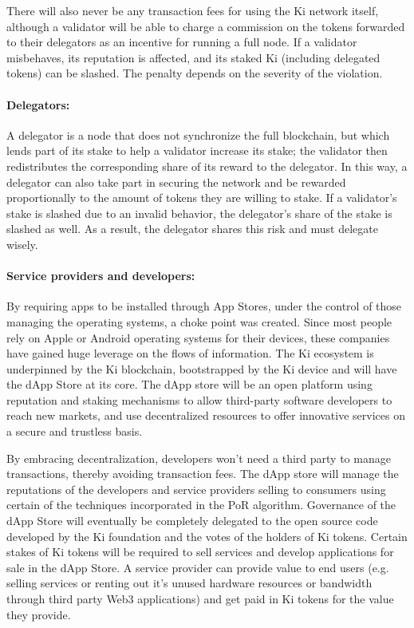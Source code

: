 There will also never be any transaction fees for using the Ki network itself, although a validator will be able to charge a commission on the tokens forwarded to their delegators as an incentive for running a full node. If a validator misbehaves, its reputation is affected, and its staked Ki (including delegated tokens) can be slashed. The penalty depends on the severity of the violation.

\paragraph{Delegators:} A delegator is a node that does not synchronize the full blockchain, but which lends part of its stake to help a validator increase its stake; the validator then redistributes the corresponding share of its reward to the delegator. In this way, a delegator can also take part in securing the network and be rewarded proportionally to the amount of tokens they are willing to stake. If a validator's stake is slashed due to an invalid behavior, the delegator's share of the stake is slashed as well. As a result, the delegator shares this risk and must delegate wisely.

\paragraph{Service providers and developers:} By requiring apps to be installed through App Stores, under the control of those managing the operating systems, a choke point was created. Since most people rely on Apple or Android operating systems for their devices, these companies have gained huge leverage on the flows of information. The Ki ecosystem is underpinned by the Ki blockchain, bootstrapped by the Ki device and will have the dApp Store at its core. The dApp store will be an open platform using reputation and staking mechanisms to allow third-party software developers to reach new markets, and use decentralized resources to offer innovative services on a secure and trustless basis.


By embracing decentralization, developers won't need a third party to manage transactions, thereby avoiding transaction fees. The dApp store will manage the reputations of the developers and service providers selling to consumers using certain of the techniques incorporated in the PoR algorithm. Governance of the dApp Store will eventually be completely delegated to the open source code developed by the Ki foundation and the votes of the holders of Ki tokens. Certain stakes of Ki tokens will be required to sell services and develop applications for sale in the dApp Store. A service provider can provide value to end users (e.g. selling services or renting out it's unused hardware resources or bandwidth through third party Web3 applications) and get paid in Ki tokens for the value they provide.

